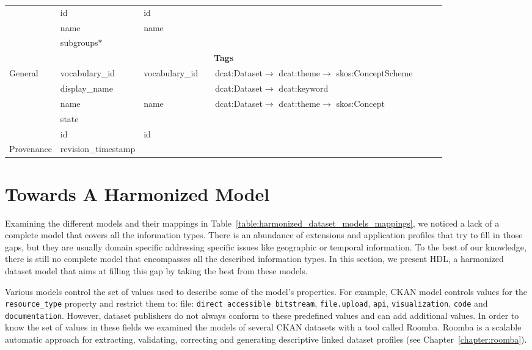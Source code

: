 \begin{landscape}
{\begin{longtable}{|p{1cm}|m{3.1cm}|m{2.4cm}|m{2.5cm}|p{3.8cm}|m{3.8cm}|m{5.55cm}|m{2.5cm}|}
\cline{2-8}
 & id & id &  &  &  &  & \tabularnewline
\cline{2-8}
 & name & name &  &  &  &  & \tabularnewline
\cline{2-8}
 & subgroups$\ast$ &  &  &  &  &  & \tabularnewline
\hline
\multicolumn{8}{|c|}{\cellcolor{blue!25}\textbf{Tags}}\tabularnewline
\hline
\multirow{5}{2cm}{General} & vocabulary\_id & vocabulary\_id &  & dcat:Dataset$\rightarrow$ dcat:theme$\rightarrow$ skos:ConceptScheme &  &  & \tabularnewline
\cline{2-8}
 & display\_name &  &  & dcat:Dataset$\rightarrow$ dcat:keyword &  &  & \tabularnewline
\cline{2-8}
 & name & name &  & dcat:Dataset$\rightarrow$ dcat:theme$\rightarrow$ skos:Concept &  &  & \tabularnewline
\cline{2-8}
 & state &  &  &  &  &  & \tabularnewline
\cline{2-8}
 & id & id &  &  &  &  & \tabularnewline
\hline
Provenance & revision\_timestamp &  &  &  &  &  & \tabularnewline
\hline
\end{longtable}
}
\end{landscape}

\restoregeometry
\pagestyle{standard}


\section{Towards A Harmonized Model}
\label{section:hdl}

Examining the different models and their mappings in Table~\ref{table:harmonized_dataset_models_mappings}, we noticed a lack of a complete model that covers all the information types. There is an abundance of extensions and application profiles that try to fill in those gaps, but they are usually domain specific addressing specific issues like geographic or temporal information. To the best of our knowledge, there is still no complete model that encompasses all the described information types. In this section, we present HDL, a harmonized dataset model that aims at filling this gap by taking the best from these models.

Various models control the set of values used to describe some of the model's properties. For example, CKAN model controls values for the \texttt{resource\_type} property and restrict them to: file: \texttt{direct accessible bitstream}, \texttt{file.upload}, \texttt{api}, \texttt{visualization}, \texttt{code} and \texttt{documentation}. However, dataset publishers do not always conform to these predefined values and can add additional values. In order to know the set of values in these fields we examined the models of several CKAN datasets with a tool called Roomba. Roomba is a scalable automatic approach for extracting, validating, correcting and generating descriptive linked dataset profiles (see Chapter~\ref{chapter:roomba}).

